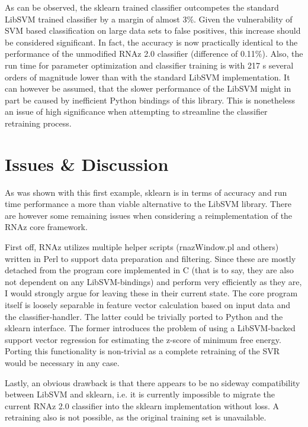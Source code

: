 \documentclass[]{article}
\begin{document}
As can be observed, the sklearn trained classifier outcompetes the standard LibSVM trained classifier by a margin of almost 3\%. Given the vulnerability of SVM based classification on large data sets to false positives, this increase should be considered significant. In fact, the accuracy is now practically identical to the performance of the unmodified RNAz 2.0 classifier (difference of 0.11\%). Also, the run time for parameter optimization and classifier training is with 217 s several orders of magnitude lower than with the standard LibSVM implementation. It can however be assumed, that the slower performance of the LibSVM might in part be caused by inefficient Python bindings of this library. This is nonetheless an issue of high significance when attempting to streamline the classifier retraining process. 

\section{Issues \& Discussion}

As was shown with this first example, sklearn is in terms of accuracy and run time performance a more than viable alternative to the LibSVM library. There are however some remaining issues when considering a reimplementation of the RNAz core framework. \newline

First off, RNAz utilizes multiple helper scripts (rnazWindow.pl and others) written in Perl to support data preparation and filtering. Since these are mostly detached from the program core implemented in C (that is to say, they are also not dependent on any LibSVM-bindings) and perform very efficiently as they are, I would strongly argue for leaving these in their current state. \newline
The core program itself is loosely separable in feature vector calculation based on input data and the classifier-handler. The latter could be trivially ported to Python and the sklearn interface. The former introduces the problem of using a LibSVM-backed support vector regression for estimating the z-score of minimum free energy. Porting this functionality is non-trivial as a complete retraining of the SVR would be necessary in any case. \newline 

Lastly, an obvious drawback is that there appears to be no sideway compatibility between LibSVM and sklearn, i.e. it is currently impossible to migrate the current RNAz 2.0 classifier into the sklearn implementation without loss. A retraining also is not possible, as the original training set is unavailable. 
\end{document}
